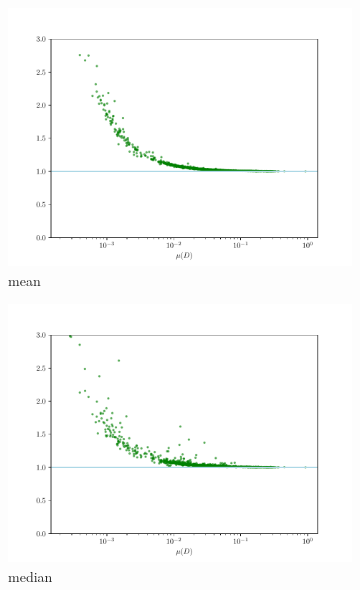 \documentclass[12pt,a4paper,automark, toc=bib]{scrreprt}
\theoremstyle{definition}
\begin{document}
		\begin{figure}
		\begin{subfigure}{0.32\linewidth}
			\includegraphics[width=\linewidth]{figures/stat_sha384_0mean_div.pdf}
			\caption{mean}
		\end{subfigure}
		\begin{subfigure}{0.32\linewidth}
			\includegraphics[width=\linewidth]{figures/stat_sha384_0median_div.pdf}
			\caption{median}
		\end{subfigure}
		\begin{subfigure}{0.32\linewidth}

\end{subfigure}
\end{figure}
\end{document}
